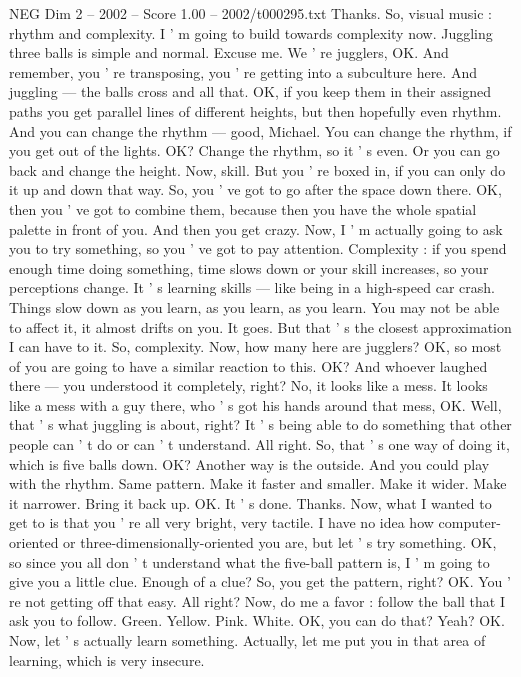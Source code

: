 \begin{textsample}{NEG Dim 2 – 2002 – Score 1.00 – 2002/t000295.txt}
Thanks.
So, visual music : rhythm and complexity.
I ' m going to build towards complexity now.
Juggling three balls is simple and normal.
Excuse me.
We ' re jugglers, OK.
And remember, you ' re transposing, you ' re getting into a subculture here.
And juggling — the balls cross and all that.
OK, if you keep them in their assigned paths you get parallel lines of different heights, but then hopefully even rhythm.
And you can change the rhythm — good, Michael.
You can change the rhythm, if you get out of the lights.
OK?
Change the rhythm, so it ' s even.
Or you can go back and change the height.
Now, skill.
But you ' re boxed in, if you can only do it up and down that way.
So, you ' ve got to go after the space down there.
OK, then you ' ve got to combine them, because then you have the whole spatial palette in front of you.
And then you get crazy.
Now, I ' m actually going to ask you to try something, so you ' ve got to pay attention.
Complexity : if you spend enough time doing something, time slows down or your skill increases, so your perceptions change.
It ' s learning skills — like being in a high-speed car crash.
Things slow down as you learn, as you learn, as you learn.
You may not be able to affect it, it almost drifts on you.
It goes.
But that ' s the closest approximation I can have to it.
So, complexity.
Now, how many here are jugglers?
OK, so most of you are going to have a similar reaction to this.
OK?
And whoever laughed there — you understood it completely, right?
No, it looks like a mess.
It looks like a mess with a guy there, who ' s got his hands around that mess, OK.
Well, that ' s what juggling is about, right?
It ' s being able to do something that other people can ' t do or can ' t understand.
All right.
So, that ' s one way of doing it, which is five balls down.
OK?
Another way is the outside.
And you could play with the rhythm.
Same pattern.
Make it faster and smaller.
Make it wider.
Make it narrower.
Bring it back up.
OK.
It ' s done.
Thanks.
Now, what I wanted to get to is that you ' re all very bright, very tactile.
I have no idea how computer-oriented or three-dimensionally-oriented you are, but let ' s try something.
OK, so since you all don ' t understand what the five-ball pattern is, I ' m going to give you a little clue.
Enough of a clue?
So, you get the pattern, right?
OK.
You ' re not getting off that easy.
All right?
Now, do me a favor : follow the ball that I ask you to follow.
Green.
Yellow.
Pink.
White.
OK, you can do that?
Yeah?
OK.
Now, let ' s actually learn something.
Actually, let me put you in that area of learning, which is very insecure.

\end{textsample}
